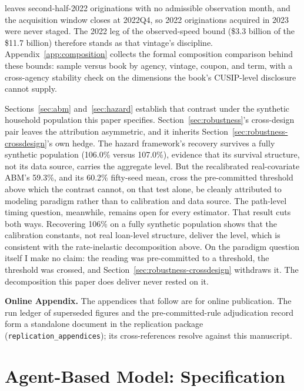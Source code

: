 \documentclass[12pt]{article}
\begin{document}
leaves second-half-2022 originations with no admissible observation month, and the acquisition window closes at 2022Q4, so 2022 originations acquired in 2023 were never staged. The 2022 leg of the observed-speed bound (\$3.3 billion of the \$11.7 billion) therefore stands as that vintage's discipline. Appendix~\ref{app:composition} collects the formal composition comparison behind these bounds: sample versus book by agency, vintage, coupon, and term, with a cross-agency stability check on the dimensions the book's CUSIP-level disclosure cannot supply.

Sections~\ref{sec:abm} and~\ref{sec:hazard} establish that contrast under the synthetic household population this paper specifies. Section~\ref{sec:robustness}'s cross-design pair leaves the attribution asymmetric, and it inherits Section~\ref{sec:robustness-crossdesign}'s own hedge. The hazard framework's recovery survives a fully synthetic population (106.0\% versus 107.0\%), evidence that its survival structure, not its data source, carries the aggregate level. But the recalibrated real-covariate ABM's 59.3\%, and its 60.2\% fifty-seed mean, cross the pre-committed threshold above which the contrast cannot, on that test alone, be cleanly attributed to modeling paradigm rather than to calibration and data source. The path-level timing question, meanwhile, remains open for every estimator. That result cuts both ways. Recovering 106\% on a fully synthetic population shows that the calibration constants, not real loan-level structure, deliver the level, which is consistent with the rate-inelastic decomposition above. On the paradigm question itself I make no claim: the reading was pre-committed to a threshold, the threshold was crossed, and Section~\ref{sec:robustness-crossdesign} withdraws it. The decomposition this paper does deliver never rested on it.

\clearpage



\clearpage
\appendix

\noindent\textbf{Online Appendix.} The appendices that follow are for online publication. The run ledger of superseded figures and the pre-committed-rule adjudication record form a standalone document in the replication package (\texttt{replication\_appendices}); its cross-references resolve against this manuscript.

\section{Agent-Based Model: Specification}\label{sec:method-abm}
\end{document}
